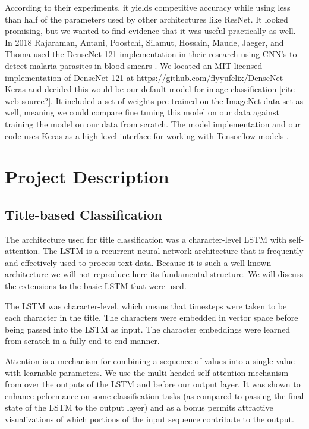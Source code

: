 \documentclass[letterpaper]{article} %
\begin{document}
According to their experiments, it yields competitive accuracy while using less
than half of the parameters used by other architectures like ResNet. It looked
promising, but we wanted to find evidence that it was useful practically as
well. In 2018 Rajaraman, Antani, Poostchi, Silamut, Hossain, Maude, Jaeger,
and Thoma used the DenseNet-121 implementation in their research using CNN’s
to detect malaria parasites in blood smears \cite{RajaramanSivaramakrishnan2018Pcnn}.
We located an MIT
licensed implementation of DenseNet-121 at
https://github.com/flyyufelix/DenseNet-Keras and decided this would be our
default model for image classification [cite web source?]. It included a set of
weights pre-trained on the ImageNet data set as well, meaning we could compare
fine tuning this model on our data against training the model on our data from
scratch. The model implementation and our code uses Keras as a high level
interface for working with Tensorflow models \cite{chollet2015keras}.

\section{Project Description}

\subsection{Title-based Classification}

The architecture used for title classification
was a character-level LSTM with self-attention.
The LSTM \cite{Hochreiter1997LongSM} is a recurrent neural network architecture
that is frequently and effectively \cite{Schmidhuber2015DeepLI}
used to process text data.
Because it is such a well known architecture
we will not reproduce here its fundamental structure.
We will discuss the extensions to the basic LSTM that were used.

The LSTM was character-level,
which means that timesteps were taken to be each character in the title.
The characters were embedded in vector space
before being passed into the LSTM as input.
The character embeddings were learned from scratch
in a fully end-to-end manner.

Attention is a mechanism for combining a sequence of values into a single value
with learnable parameters.
We use the multi-headed self-attention mechanism from \cite{Lin2017ASS}
over the outputs of the LSTM and before our output layer.
It was shown to enhance peformance on some classification tasks
(as compared to passing the final state of the LSTM to the output layer)
and as a bonus permits attractive visualizations
of which portions of the input sequence contribute to the output.
\end{document}
